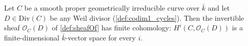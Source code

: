 \begin{theorem}

  \label{thm:HModule_lineBundle_finite}
  Let \(C\) be a smooth proper geometrically irreducible curve over
  \(\bar k\) and let \(D \in \mathrm{Div}(C)\) be any Weil divisor
  (\cref{def:codim1_cycles}). Then the invertible sheaf
  \(\mathcal O_C(D)\) of \cref{def:sheafOf} has finite cohomology:
  \(H^i(C, \mathcal O_C(D))\) is a finite-dimensional \(\bar k\)-vector
  space for every \(i\).

\end{theorem}

